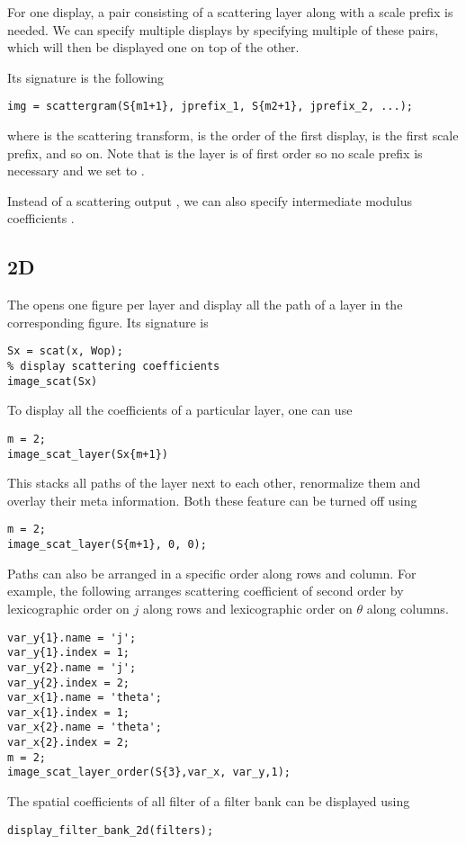 \documentclass{article}
\begin{document}
For one display, a pair consisting of a scattering layer along with a scale prefix is needed. We can specify multiple displays by specifying multiple of these pairs, which will then be displayed one on top of the other.

Its signature is the following
\begin{lstlisting}
img = scattergram(S{m1+1}, jprefix_1, S{m2+1}, jprefix_2, ...);
\end{lstlisting}
where  is the scattering transform,  is the order of the first display,  is the first scale prefix, and so on. Note that is  the layer is of first order so no scale prefix is necessary and we set  to \mcode{[]}.

Instead of a scattering output , we can also specify intermediate modulus coefficients .

\subsection{2D}

The  opens one figure per layer and display all the path of a layer in the corresponding figure. Its signature is 
\begin{lstlisting}
Sx = scat(x, Wop);
% display scattering coefficients
image_scat(Sx)
\end{lstlisting}

To display all the coefficients of a particular layer, one can use 
\begin{lstlisting}
m = 2;
image_scat_layer(Sx{m+1})
\end{lstlisting}
This stacks all paths of the layer next to each other, renormalize them and overlay their meta information. Both these feature can be turned off using
\begin{lstlisting}
m = 2;
image_scat_layer(S{m+1}, 0, 0);
\end{lstlisting}
Paths can also be arranged in a specific order along rows and column.
For example, the following arranges scattering coefficient of second order
by lexicographic order on $j$ along rows and lexicographic order on $\theta$ along columns.
\begin{lstlisting}
var_y{1}.name = 'j';
var_y{1}.index = 1;
var_y{2}.name = 'j';
var_y{2}.index = 2;
var_x{1}.name = 'theta';
var_x{1}.index = 1;
var_x{2}.name = 'theta';
var_x{2}.index = 2;
m = 2;
image_scat_layer_order(S{3},var_x, var_y,1);
\end{lstlisting}
The spatial coefficients of all filter of a filter bank can be displayed using
\begin{lstlisting}
display_filter_bank_2d(filters);
\end{lstlisting}
\end{document}
